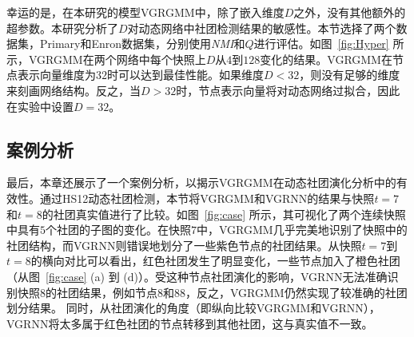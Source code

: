 幸运的是，在本研究的模型VGRGMM中，除了嵌入维度$D$之外，没有其他额外的超参数。本研究分析了$D$对动态网络中社团检测结果的敏感性。本节选择了两个数据集，Primary和Enron数据集，分别使用\emph{NMI}和$Q$进行评估。如图~\ref{fig:Hyper} 所示，VGRGMM在两个网络中每个快照上$D$从$4$到$128$变化的结果。VGRGMM在节点表示向量维度为$32$时可以达到最佳性能。如果维度$D < 32$，则没有足够的维度来刻画网络结构。反之，当$D > 32$时，节点表示向量将对动态网络过拟合，因此在实验中设置$D = 32$。





\subsection{案例分析}


最后，本章还展示了一个案例分析，以揭示VGRGMM在动态社团演化分析中的有效性。通过HS12动态社团检测，本节将VGRGMM和VGRNN的结果与快照$t=7$和$t=8$的社团真实值进行了比较。如图~\ref{fig:case} 所示，其可视化了两个连续快照中具有$5$个社团的子图的变化。在快照$7$中，VGRGMM几乎完美地识别了快照中的社团结构，而VGRNN则错误地划分了一些紫色节点的社团结果。从快照$t=7$到$t=8$的横向对比可以看出，红色社团发生了明显变化，一些节点加入了橙色社团（从图~\ref{fig:case} (a) 到 (d)）。受这种节点社团演化的影响，VGRNN无法准确识别快照$8$的社团结果，例如节点$8$和$88$，反之，VGRGMM仍然实现了较准确的社团划分结果。
同时，从社团演化的角度（即纵向比较VGRGMM和VGRNN），VGRNN将太多属于红色社团的节点转移到其他社团，这与真实值不一致。


